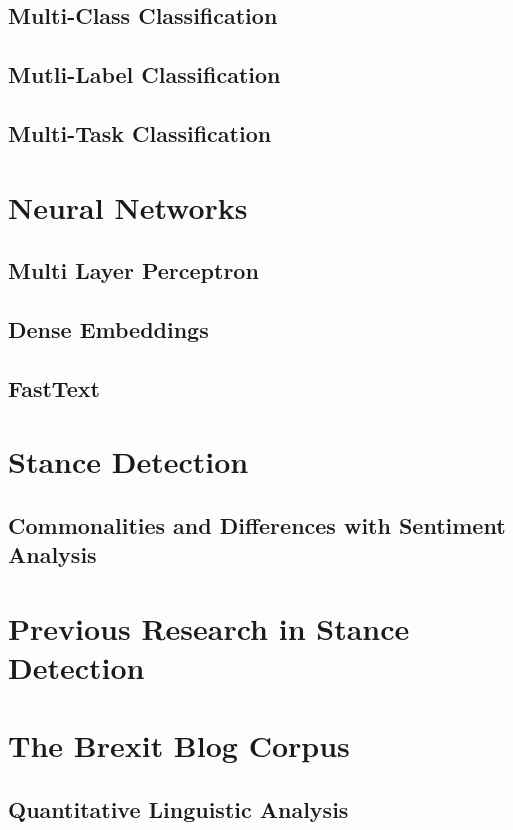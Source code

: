 \documentclass[Dissertation.tex]{subfiles}
\begin{document}
\subsection{Multi-Class Classification}
\subsection{Mutli-Label Classification}
\subsection{Multi-Task Classification}
\section{Neural Networks}
\subsection{Multi Layer Perceptron}
\subsection{Dense Embeddings}
\subsection{FastText}
\section{Stance Detection}	
\subsection{Commonalities and Differences with Sentiment Analysis}
\section{Previous Research in Stance Detection}
\section{The Brexit Blog Corpus}
\subsection{Quantitative Linguistic Analysis}
\end{document}
